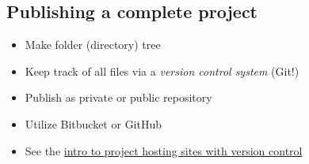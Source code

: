 \documentclass[%
oneside,                 %
final,                   %
10pt]{article}
\begin{document}
\noindent
\subsection*{Publishing a complete project}
\label{decay:exper:github}

\begin{itemize}
 \item Make folder (directory) tree

 \item Keep track of all files via a \emph{version control system} (Git!)

 \item Publish as private or public repository

 \item Utilize Bitbucket or GitHub

 \item See the \href{{http://hplgit.github.com/teamods/bitgit/html/}}{intro to project hosting sites with version control}
\end{itemize}

\noindent


\cleardoublepage{}  %
\printindex
\end{document}
